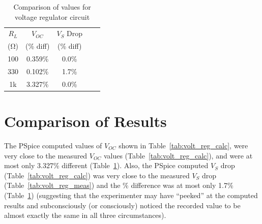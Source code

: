 \documentclass{article}
\begin{document}
\begin{table}
  \centering
  \begin{tabular}{ccccc}
    $R_L$       & $V_{OC}$  & $V_S$ Drop \\
    (\si{\ohm}) & (\% diff) & (\% diff)  \\
    \hline
    100         & 0.359\%   & 0.0\%      \\
    330         & 0.102\%   & 1.7\%      \\
    1k          & 3.327\%   & 0.0\%      \\
  \end{tabular}
  \caption{\label{tab:volt_reg_diff} Comparison of values for voltage regulator circuit}
\end{table}

\section{Comparison of Results}
\label{sec:comp_of_res}

The PSpice computed values of $V_{OC}$ shown in Table~\ref{tab:volt_reg_calc}, were very close to the measured $V_{OC}$ values (Table~\ref{tab:volt_reg_calc}), and were at most only 3.327\% different (Table~\ref{tab:volt_reg_diff}).  Also, the PSpice computed $V_S$ drop (Table~\ref{tab:volt_reg_calc}) was very close to the measured $V_S$ drop (Table~\ref{tab:volt_reg_meas}) and the \% difference was at most only 1.7\% (Table~\ref{tab:volt_reg_diff}) (suggesting that the experimenter may have “peeked” at the computed results and subconsciously (or consciously) noticed the recorded value to be almost exactly the same in all three circumstances).
\end{document}
